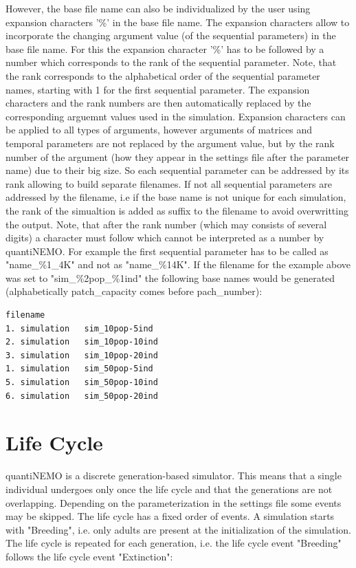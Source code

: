 \documentclass[letterpaper,12pt,oneside]{book}
\begin{document}
However, the base file name can also be individualized by the user using expansion characters '\%' in the base file name. The expansion characters allow to incorporate the changing argument value (of the sequential parameters) in the base file name. For this the expansion character '\%' has to be followed by a number which corresponds to the rank of the sequential parameter. Note, that the rank corresponds to the alphabetical order of the sequential parameter names, starting with 1 for the first sequential parameter. The expansion characters and the rank numbers are then automatically replaced by the corresponding arguemnt values used in the simulation. Expansion characters can be applied to all types of arguments, however arguments of matrices and temporal parameters are not replaced by the argument value, but by the rank number of the argument (how they appear in the settings file after the parameter name) due to their big size. So each sequential parameter can be addressed by its rank allowing to build separate filenames. If not all sequential parameters are addressed by the filename, i.e if the base name is not unique for each simulation, the rank of the simualtion is added as suffix to the filename to avoid overwritting the output. Note, that after the rank number (which may consists of several digits) a character must follow which cannot be interpreted as a number by quantiNEMO. For example the first sequential parameter has to be called as "name\_\%1\_4K" and not as "name\_\%14K". If the \textsf{filename} for the example above was set to "sim\_\%2pop\_\%1ind" the following base names would be generated (alphabetically \textsf{patch\_capacity} comes before \textsf{pach\_number}):  
\begin{lstlisting}[frame=single]
                filename
1. simulation   sim_10pop-5ind
2. simulation   sim_10pop-10ind
3. simulation   sim_10pop-20ind
1. simulation   sim_50pop-5ind
5. simulation   sim_50pop-10ind
6. simulation   sim_50pop-20ind
\end{lstlisting} 


\newpage
\chapter{Life Cycle}\label{lce}
quantiNEMO is a discrete generation-based simulator. This means that a single individual undergoes only once the life cycle and that the generations are not overlapping. Depending on the parameterization in the settings file some events may be skipped. The life cycle has a fixed order of events. A simulation starts with "Breeding", i.e. only adults are present at the initialization of the simulation. The life cycle is repeated for each generation, i.e. the life cycle event "Breeding" follows the life cycle event "Extinction": 
\end{document}
